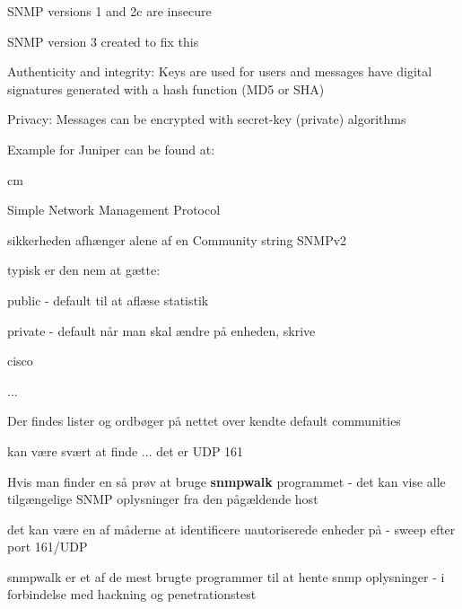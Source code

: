 \documentclass[Screen16to9,17pt]{foils}
\begin{document}

\begin{list2}
\item SNMP versions 1 and 2c are insecure
\item SNMP version 3 created to fix this
\item Authenticity and integrity: Keys are used for
users and messages have digital signatures
generated with a hash function (MD5 or SHA)
\item Privacy: Messages can be encrypted with
secret-key (private) algorithms
\end{list2}

Example for Juniper can be found at:\\
{\small{}}


 cm

\begin{list1}
\item Simple Network Management Protocol
\item sikkerheden afhænger alene af en Community string SNMPv2
\item typisk er den nem at gætte:
  \begin{list2}
    \item public - default til at aflæse statistik
\item private - default når man skal ændre på enheden, skrive
\item cisco
\item ...
  \end{list2}
\item Der findes lister og ordbøger på nettet over kendte default communities
\end{list1}


\begin{list1}
  \item kan være svært at finde ... det er UDP 161
\item Hvis man finder en så prøv at bruge {\bfseries snmpwalk}
  programmet - det kan vise alle tilgængelige SNMP oplysninger fra den
  pågældende host
\item det kan være en af måderne at identificere uautoriserede enheder på - sweep efter port 161/UDP
\item snmpwalk er et af de mest brugte programmer til at hente snmp
  oplysninger - i forbindelse med hackning og penetrationstest
\end{list1}
\end{document}
